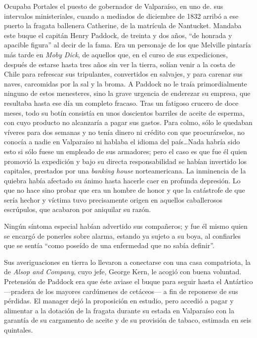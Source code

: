 \documentclass[10pt,twoside,openright]{memoir}
\begin{document}
Ocupaba Portales el puesto de
gobernador de Valparaíso, en uno de. sus intervalos ministeriales,
cuando a mediados de diciembre de 1832 arribó a ese puerto la fragata
ballenera Catherine, de la matrícula de Nantucket. Mandaba este buque el
capitán Henry Paddock, de treinta y dos años, ``de honrada y apacible
figura'' al decir de la fama. Era un personaje de los que Melville
pintaría más tarde en \emph{Moby Dick}, de aquellos que, en el curso de sus
expediciones, después de estarse hasta tres años sin ver la tierra,
solían venir a la costa de Chile para refrescar sus tripulantes,
convertidos en salvajes, y para carenar sus naves, carcomidas por la sal
y la broma. A Paddock no le traía primordialmente ninguno de estos
menesteres, sino la grave urgencia de enderezar su empresa, que
resultaba
hasta ese día un completo fracaso. Tras un fatigoso crucero de doce
meses, todo su botín consistía en unos doscientos barriles de aceite de
esperma, con cuyo producto no alcanzaría a pagar sus gastos. Para colmo,
sólo le quedaban víveres para dos semanas y no tenía dinero ni crédito
con que procurárselos, no conocía a nadie en Valparaíso ni hablaba el
idioma del país\ldots Nada habría sido esto si sólo fuese un empleado de
sus armadores; pero el caso es que fue él quien promovió la expedición y
bajo su directa responsabilidad se habían invertido los capitales,
prestados por una \emph{banking house} norteamericana. La inminencia de la
quiebra había afectado su ánimo hasta hacerle caer en profunda
depresión. Lo que no hace sino probar que era un hombre de honor y que
la catástrofe de que sería hechor y víctima tuvo precisamente origen en
aquellos caballerosos escrúpulos, que acabaron por aniquilar su razón.

Ningún síntoma especial habían advertido sus compañeros; y fue él mismo
quien se encargó de ponerles sobre alarma, estando ya sujeto a su boya,
al confiarles que se sentía ``como poseído de una enfermedad que no sabía
definir''.

Sus averiguaciones en tierra lo llevaron a conectarse con una casa
compatriota, la de \emph{Alsop and Company}, cuyo jefe, George Kern, le acogió
con buena voluntad. Pretensión de Paddock era que éste aviase el buque
para seguir hasta el Antártico ---pradera de los mayores cardúmenes de
cetáceos--- a fin de reponerse de sus pérdidas. El manager dejó la
proposición en estudio, pero accedió a pagar y alimentar a la dotación
de la fragata durante su estada en Valparaíso con la garantía de su
cargamento de aceite y de su provisión de tabaco, estimada en seis
quintales.
\end{document}
